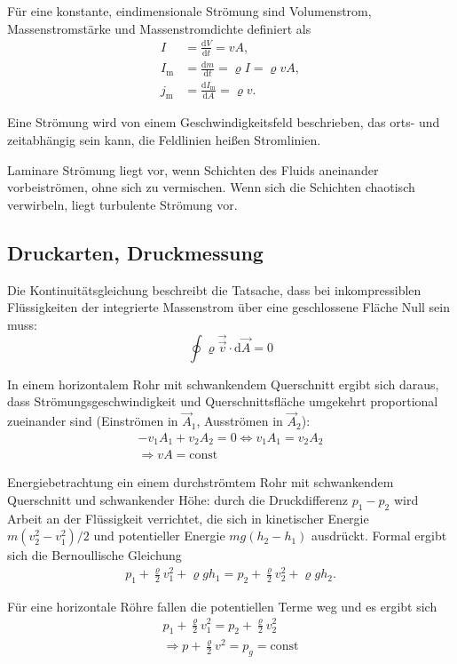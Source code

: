 \documentclass[a4paper]{scrartcl}
\begin{document}
Für eine konstante, eindimensionale Strömung sind Volumenstrom, Massenstromstärke und Massenstromdichte definiert als
\begin{align*}
  I &= \frac{\text{d}V}{\text{d}t} = vA,\\
  I_\text{m} &= \frac{\text{d}m}{\text{d}t} = \varrho I = \varrho vA,\\
  j_\text{m} &= \frac{\text{d}I_\text{m}}{\text{d}A} = \varrho v.
\end{align*}

Eine Strömung wird von einem Geschwindigkeitsfeld beschrieben, das orts- und zeitabhängig sein kann, die Feldlinien heißen Stromlinien.

Laminare Strömung liegt vor, wenn Schichten des Fluids aneinander vorbeiströmen, ohne sich zu vermischen. Wenn sich die Schichten chaotisch verwirbeln, liegt turbulente Strömung vor.

\subsection{Druckarten, Druckmessung}
Die Kontinuitätsgleichung beschreibt die Tatsache, dass bei inkompressiblen Flüssigkeiten der integrierte Massenstrom über eine geschlossene Fläche Null sein muss:
\begin{equation*}
  \oint \varrho \vec \vec v\cdot\text{d}\vec A = 0
\end{equation*}

In einem horizontalem Rohr mit schwankendem Querschnitt ergibt sich daraus, dass Strömungsgeschwindigkeit und Querschnittsfläche umgekehrt proportional zueinander sind (Einströmen in $\vec A_1$, Ausströmen in $\vec A_2$):
\begin{align*}
  -v_1A_1 + v_2A_2 = 0 \iff v_1A_1 = v_2A_2 \\
  \Rightarrow vA = \text{const}
\end{align*}

Energiebetrachtung ein einem durchströmtem Rohr mit schwankendem Querschnitt und schwankender Höhe: durch die Druckdifferenz $p_1-p_2$ wird Arbeit an der Flüssigkeit verrichtet, die sich in kinetischer Energie $m(v_2^2-v_1^2)/2$ und potentieller Energie $mg(h_2-h_1)$ ausdrückt. Formal ergibt sich die Bernoullische Gleichung
\begin{align*}
  p_1 + \frac{\varrho}{2}v_1^2 + \varrho gh_1 = p_2 + \frac{\varrho}{2}v_2^2 + \varrho gh_2.
\end{align*}

Für eine horizontale Röhre fallen die potentiellen Terme weg und es ergibt sich
\begin{align*}
  p_1 + \frac{\varrho}{2}v_1^2  = p_2 + \frac{\varrho}{2}v_2^2\\
  \Rightarrow p+\frac{\varrho}{2}v^2 = p_g = \text{const}
\end{align*}
\end{document}
